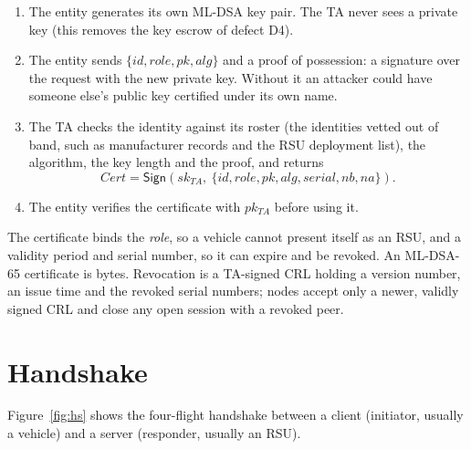 \begin{enumerate}
\item The entity generates its own ML-DSA key pair. The TA never sees a
private key (this removes the key escrow of defect D4).
\item The entity sends $\{id, role, pk, alg\}$ and a proof of possession: a
signature over the request with the new private key. Without it an attacker
could have someone else's public key certified under its own name.
\item The TA checks the identity against its roster (the identities vetted out
of band, such as manufacturer records and the RSU deployment list), the
algorithm, the key length and the proof, and returns
\[ Cert = \mathsf{Sign}(sk_{TA},\ \{id, role, pk, alg, serial, nb, na\}). \]
\item The entity verifies the certificate with $pk_{TA}$ before using it.
\end{enumerate}

The certificate binds the \emph{role}, so a vehicle cannot present itself as
an RSU, and a validity period and serial number, so it can expire and be
revoked. An ML-DSA-65 certificate is  bytes. Revocation is a
TA-signed CRL holding a version number, an issue time and the revoked serial
numbers; nodes accept only a
newer, validly signed CRL and close any open session with a revoked peer.

\section{Handshake}
\label{sec:handshake}

Figure~\ref{fig:hs} shows the four-flight handshake between a client
(initiator, usually a vehicle) and a server (responder, usually an RSU).

